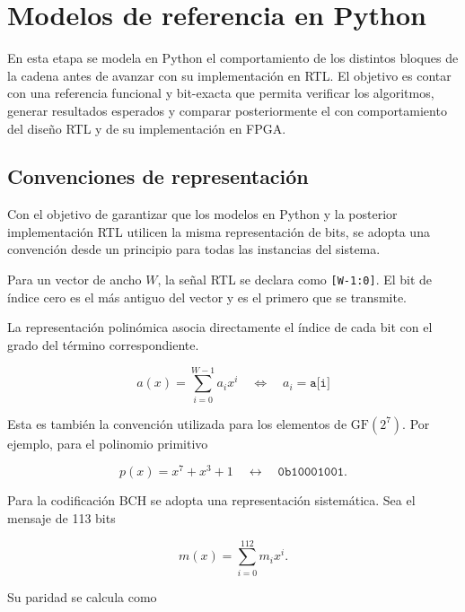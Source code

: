 \documentclass[10pt,a4paper]{article}
\begin{document}
\section{Modelos de referencia en Python}
En esta etapa se modela en Python el comportamiento de los distintos bloques de
la cadena antes de avanzar con su implementación en RTL. El objetivo es contar
con una referencia funcional y bit-exacta que permita verificar los algoritmos,
generar resultados esperados y comparar posteriormente el con comportamiento 
del diseño RTL y de su implementación en FPGA.

\subsection{Convenciones de representación}

Con el objetivo de garantizar que los modelos en Python y la posterior
implementación RTL utilicen la misma representación de bits, se adopta una 
convención desde un principio para todas las instancias del sistema.

Para un vector de ancho $W$, la señal RTL se declara como
\texttt{[W-1:0]}. El bit de índice cero es el más antiguo del vector y es el
primero que se transmite.

La representación polinómica asocia directamente el índice de cada bit con el
grado del término correspondiente.

\begin{equation}
    a(x)=\sum_{i=0}^{W-1}a_i x^i
    \quad \Longleftrightarrow \quad 
    a_i=\texttt{a[i]}
\end{equation}

Esta es también la convención utilizada para los elementos de $\mathrm{GF}(2^7)$. 
Por ejemplo, para el polinomio primitivo

\begin{equation}
    p(x)=x^7+x^3+1 \quad\longleftrightarrow\quad \texttt{0b10001001}.
\end{equation}


Para la codificación BCH se adopta una representación sistemática. Sea el
mensaje de 113 bits

\begin{equation}
    m(x)=\sum_{i=0}^{112}m_i x^i.
\end{equation}

Su paridad se calcula como
\end{document}
